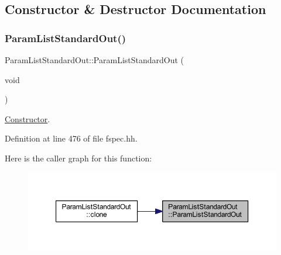 \subsection{Constructor \& Destructor Documentation}
\mbox{\label{class_param_list_standard_out_aab54e2b42115e402ac062b4c774ff960}} 
\subsubsection{\texorpdfstring{ParamListStandardOut()}{ParamListStandardOut()}\hspace{0.1cm}{\footnotesize\ttfamily [1/2]}}
{\footnotesize\ttfamily Param\+List\+Standard\+Out\+::\+Param\+List\+Standard\+Out (\begin{DoxyParamCaption}\item[{void}]{ }\end{DoxyParamCaption})\hspace{0.3cm}{\ttfamily [inline]}}



\mbox{\hyperlink{class_constructor}{Constructor}}. 



Definition at line 476 of file fspec.\+hh.

Here is the caller graph for this function\+:
\nopagebreak
\begin{figure}[H]
\begin{center}
\leavevmode
\includegraphics[width=350pt]{class_param_list_standard_out_aab54e2b42115e402ac062b4c774ff960_icgraph}
\end{center}
\end{figure}
\mbox{\label{class_param_list_standard_out_a3dabd4d3d1aaf7c4690ec3c45e8a6392}} 
